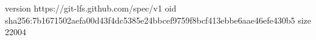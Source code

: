 version https://git-lfs.github.com/spec/v1
oid sha256:7b1671502aefa00d43f4dc5385e24bbcef9759f8bcf413ebbe6aae46efe430b5
size 22004

